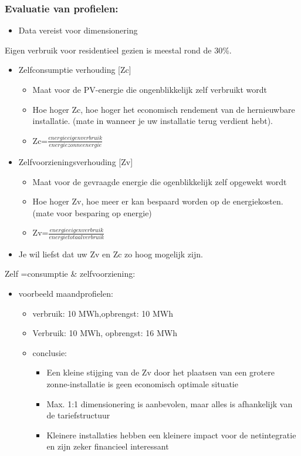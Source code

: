 \documentclass[12pt]{article}
\begin{document}
\subsubsection{Evaluatie van profielen:}
\begin{itemize}
    \item Data vereist voor dimensionering
\end{itemize}
Eigen verbruik voor residentieel gezien is meestal rond de 30\%.\begin{itemize}
    \item Zelfconsumptie verhouding [Zc]\begin{itemize}
        \item Maat voor de PV-energie die ongenblikkelijk zelf verbruikt wordt 
        \item Hoe hoger Zc, hoe hoger het economisch rendement van de hernieuwbare installatie. (mate in wanneer je uw installatie terug verdient hebt).
        \item Zc=$\frac{energie eigen verbruik}{energie zonne energie}$
    \end{itemize}
    \item Zelfvoorzieningsverhouding [Zv]\begin{itemize}
        \item Maat voor de gevraagde energie die ogenblikkelijk zelf opgewekt wordt 
        \item Hoe hoger Zv, hoe meer er kan bespaard worden op de energiekosten. (mate voor besparing op energie)
        \item Zv=$\frac{energie eigen verbruik}{energie totaal verbruik}$
    \end{itemize}
    \item Je wil liefst dat uw Zv en Zc zo hoog mogelijk zijn.
\end{itemize}
Zelf =consumptie \& zelfvoorziening:\begin{itemize}
    \item voorbeeld maandprofielen:\begin{itemize}
        \item verbruik: 10 MWh,opbrengst: 10 MWh 
        \item Verbruik: 10 MWh, opbrengst: 16 MWh 
        \item conclusie:\begin{itemize}
            \item Een kleine stijging van de Zv door het plaatsen van een grotere zonne-installatie is geen economisch optimale situatie
            \item Max. 1:1 dimensionering is aanbevolen, maar alles is afhankelijk van de tariefstructuur
            \item Kleinere installaties hebben een kleinere impact voor de netintegratie en zijn zeker financieel interessant
        \end{itemize}
    \end{itemize}
\end{itemize}
\end{document}
